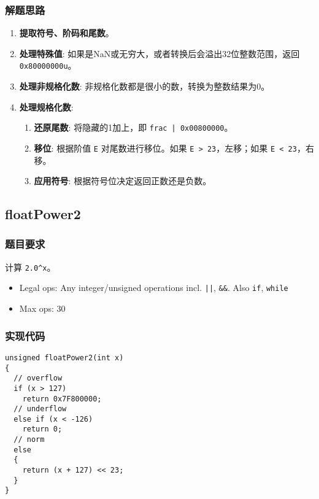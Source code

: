 \documentclass{article}
\begin{document}
\subsubsection{解题思路}
\begin{enumerate}
    \item \textbf{提取符号、阶码和尾数}。
    \item \textbf{处理特殊值}: 如果是NaN或无穷大，或者转换后会溢出32位整数范围，返回 \texttt{0x80000000u}。
    \item \textbf{处理非规格化数}: 非规格化数都是很小的数，转换为整数结果为0。
    \item \textbf{处理规格化数}:\begin{enumerate}
      \item \textbf{还原尾数}: 将隐藏的1加上，即 \texttt{frac | 0x00800000}。
      \item \textbf{移位}: 根据阶值 \texttt{E} 对尾数进行移位。如果 \texttt{E > 23}，左移；如果 \texttt{E < 23}，右移。
      \item \textbf{应用符号}: 根据符号位决定返回正数还是负数。
    \end{enumerate}
\end{enumerate}

\subsection{floatPower2}
\subsubsection{题目要求}
计算 \texttt{2.0\^{}x}。
\begin{itemize}
    \item Legal ops: Any integer/unsigned operations incl. \texttt{||}, \texttt{\&\&}. Also \texttt{if}, \texttt{while}
    \item Max ops: 30
\end{itemize}

\subsubsection{实现代码}
\begin{lstlisting}[caption={floatPower2}]
unsigned floatPower2(int x)
{
  // overflow
  if (x > 127)
    return 0x7F800000;
  // underflow
  else if (x < -126)
    return 0;
  // norm
  else
  {
    return (x + 127) << 23;
  }
}
\end{lstlisting}
\end{document}
